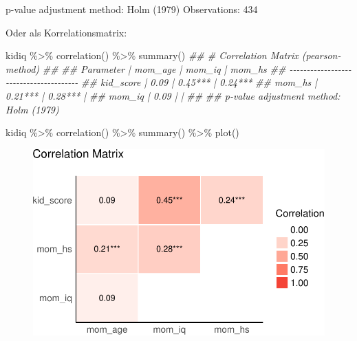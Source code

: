 \documentclass[
  a4paper,
  DIV=11]{scrreprt}
\newenvironment{Shaded}{\begin{snugshade}}{\end{snugshade}}
\newcommand{\DocumentationTok}[1]{\textcolor[rgb]{0.37,0.37,0.37}{\textit{#1}}}
\newcommand{\FunctionTok}[1]{\textcolor[rgb]{0.28,0.35,0.67}{#1}}
\newcommand{\NormalTok}[1]{\textcolor[rgb]{0.00,0.23,0.31}{#1}}
\newcommand{\SpecialCharTok}[1]{\textcolor[rgb]{0.37,0.37,0.37}{#1}}
\theoremstyle{definition}
\theoremstyle{remark}
\begin{document}
p-value adjustment method: Holm (1979) Observations: 434

Oder als Korrelationsmatrix:

\begin{Shaded}
\begin{Highlighting}[]
\NormalTok{kidiq }\SpecialCharTok{\%\textgreater{}\%} 
  \FunctionTok{correlation}\NormalTok{() }\SpecialCharTok{\%\textgreater{}\%} 
  \FunctionTok{summary}\NormalTok{()}
\DocumentationTok{\#\# \# Correlation Matrix (pearson{-}method)}
\DocumentationTok{\#\# }
\DocumentationTok{\#\# Parameter | mom\_age |  mom\_iq |  mom\_hs}
\DocumentationTok{\#\# {-}{-}{-}{-}{-}{-}{-}{-}{-}{-}{-}{-}{-}{-}{-}{-}{-}{-}{-}{-}{-}{-}{-}{-}{-}{-}{-}{-}{-}{-}{-}{-}{-}{-}{-}{-}{-}{-}{-}}
\DocumentationTok{\#\# kid\_score |    0.09 | 0.45*** | 0.24***}
\DocumentationTok{\#\# mom\_hs    | 0.21*** | 0.28*** |        }
\DocumentationTok{\#\# mom\_iq    |    0.09 |         |        }
\DocumentationTok{\#\# }
\DocumentationTok{\#\# p{-}value adjustment method: Holm (1979)}
\end{Highlighting}
\end{Shaded}

\begin{Shaded}
\begin{Highlighting}[]
\NormalTok{kidiq }\SpecialCharTok{\%\textgreater{}\%} 
  \FunctionTok{correlation}\NormalTok{() }\SpecialCharTok{\%\textgreater{}\%} 
  \FunctionTok{summary}\NormalTok{() }\SpecialCharTok{\%\textgreater{}\%} 
  \FunctionTok{plot}\NormalTok{()}
\end{Highlighting}
\end{Shaded}

\begin{figure}[H]

{\centering \includegraphics{./metrische-AV_files/figure-pdf/unnamed-chunk-43-1.pdf}

}

\end{figure}
\end{document}
